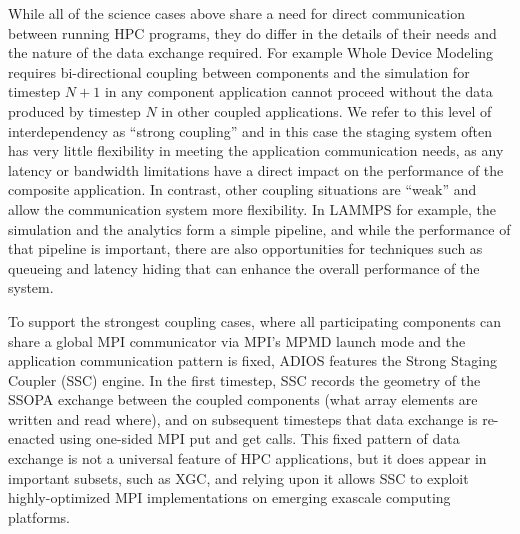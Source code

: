 While all of the science cases above share a need for direct communication between
running HPC programs, they do differ in the details of their needs and the nature 
of the data exchange required.  For example Whole Device Modeling requires bi-directional coupling between components and the 
simulation for timestep $N+1$ in any component application cannot proceed without 
the data produced by timestep $N$ in other coupled applications.  We refer to this
level of interdependency as ``strong coupling'' and in this case the staging system
often has very little flexibility in meeting the application communication needs, 
as any latency or bandwidth limitations have a direct impact on the performance 
of the composite application.  In contrast, other coupling situations are ``weak''
and allow the communication system more flexibility.  In LAMMPS for example, 
the simulation and the analytics form a simple pipeline, and while the performance 
of that pipeline is important, there are also opportunities for techniques such 
as queueing and latency hiding that can enhance the overall performance of the
system.

To support the strongest coupling cases, where all participating components can 
share a global MPI communicator via MPI's MPMD launch mode and the application
communication pattern is fixed, ADIOS features the Strong Staging Coupler (SSC)
engine. In the first timestep, SSC records the geometry of the SSOPA exchange between the coupled components (what array elements are written and read where), and on
subsequent timesteps that data exchange is re-enacted using one-sided MPI put 
and get calls.  This fixed pattern of data exchange is not a universal feature 
of HPC applications, but it does appear in important subsets, such as XGC, and
relying upon it allows SSC to exploit highly-optimized MPI implementations on 
emerging exascale computing platforms.

